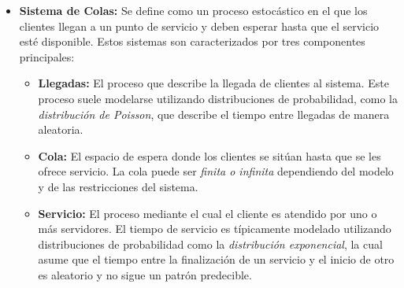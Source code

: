 \documentclass{article}
\begin{document}
\begin{itemize}
    \item \textbf{Sistema de Colas:} Se define como un proceso estocástico en el que los clientes llegan a un punto de servicio y deben esperar hasta que el servicio esté disponible. Estos sistemas son caracterizados por tres componentes principales:
    \begin{itemize}
        \item \textbf{Llegadas:} El proceso que describe la llegada de clientes al sistema. Este proceso suele modelarse utilizando distribuciones de probabilidad, como la \textit{distribución de Poisson}, que describe el tiempo entre llegadas de manera aleatoria.
        \item \textbf{Cola:} El espacio de espera donde los clientes se sitúan hasta que se les ofrece servicio. La cola puede ser \textit{finita o infinita} dependiendo del modelo y de las restricciones del sistema.
        \item \textbf{Servicio:} El proceso mediante el cual el cliente es atendido por uno o más servidores. El tiempo de servicio es típicamente modelado utilizando distribuciones de probabilidad como la \textit{distribución exponencial}, la cual asume que el tiempo entre la finalización de un servicio y el inicio de otro es aleatorio y no sigue un patrón predecible.
    \end{itemize}
    

\end{itemize}
\end{document}
